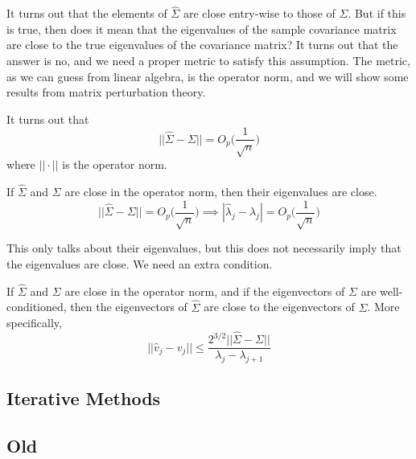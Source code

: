   It turns out that the elements of $\hat{\Sigma}$ are close entry-wise to those of $\Sigma$. But if this is true, then does it mean that the eigenvalues of the sample covariance matrix are close to the true eigenvalues of the covariance matrix? It turns out that the answer is no, and we need a proper metric to satisfy this assumption. The metric, as we can guess from linear algebra, is the operator norm, and we will show some results from matrix perturbation theory. 

  \begin{lemma}[]
    It turns out that 
    \begin{equation}
      ||\hat{\Sigma} - \Sigma|| = O_p \bigg( \frac{1}{\sqrt{n}} \bigg)
    \end{equation}
    where $|| \cdot ||$ is the operator norm. 
  \end{lemma}

  \begin{theorem}
    If $\hat{\Sigma}$ and $\Sigma$ are close in the operator norm, then their eigenvalues are close. 
    \begin{equation}
      ||\hat{\Sigma} - \Sigma|| = O_p \bigg( \frac{1}{\sqrt{n}} \bigg) \implies |\hat{\lambda}_j - \lambda_j| = O_p \bigg( \frac{1}{\sqrt{n}} \bigg) 
    \end{equation}
  \end{theorem}

  This only talks about their eigenvalues, but this does not necessarily imply that the eigenvalues are close. We need an extra condition. 

  \begin{theorem}
    If $\hat{\Sigma}$ and $\Sigma$ are close in the operator norm, and if the eigenvectors of $\Sigma$ are well-conditioned, then the eigenvectors of $\hat{\Sigma}$ are close to the eigenvectors of $\Sigma$. More specifically, 
    \begin{equation}
      ||\hat{v}_j - v_j|| \leq \frac{2^{3/2} ||\hat{\Sigma} - \Sigma||}{\lambda_j - \lambda_{j+1}}
    \end{equation}
  \end{theorem}

\subsection{Iterative Methods}

\subsection{Old}

